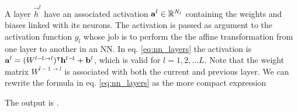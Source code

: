 
    A layer $\vec{h}^l$ have an associated activation $\vec{a}^l \in \RR[N_l]$ containing the weights  and biases linked with its neurons. The activation is passed as argument to the activation function $g_l$ whose job is to perform the the affine transformation from one layer to another in an NN. In eq. \eqref{eq:nn_layers} the activation is $\vec{a}^l = (W^{l-\! 1\to l})\TT\vec{h}^{l -\!1} + \vec{b}^l$, which is valid for $l= 1, 2,\dots L$. Note that the weight matrix $W^{l-\! 1\to l}$ is associated with both the current and previous layer. We can rewrite the formula in eq. \eqref{eq:nn_layers} as the more compact expression
    
    The output is .


